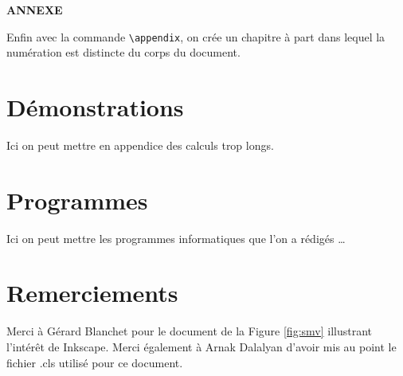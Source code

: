 
\begin{center}
    {\bf ANNEXE}
  \end{center}
Enfin avec la commande \lstinline+\appendix+, on crée un chapitre à part dans lequel la numération est distincte du corps du document.
\chapter{Démonstrations }
Ici on peut mettre en appendice des calculs trop longs. 
\chapter{Programmes}
Ici on peut mettre les programmes informatiques que l'on a rédigés \ldots

\chapter{Remerciements}
Merci \`a G\'erard Blanchet pour le document  de la Figure \ref{fig:smv}
illustrant l'intérêt de Inkscape. Merci \'egalement \`a Arnak Dalalyan
d'avoir mis au point le fichier .cls utilisé pour ce document.